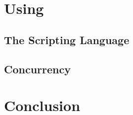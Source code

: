 \section{Using \us}

\subsection{The \us Scripting Language}


\subsection{Concurrency}
%
%
%


\section{Conclusion}




